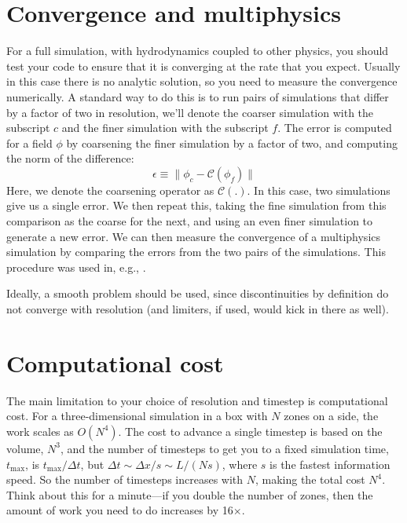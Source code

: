 \section{Convergence and multiphysics}

For a full simulation, with hydrodynamics coupled to other physics,
you should test your code to ensure that it is converging at the rate
that you expect.  Usually in this case there is no analytic solution,
so you need to measure the convergence numerically.  A standard way to
do this is to run pairs of simulations that differ by a factor of two
in resolution, we'll denote the coarser simulation with the subscript
$c$ and the finer simulation with the subscript $f$.  The error is
computed for a field $\phi$ by coarsening the finer simulation by a
factor of two, and computing the norm of the difference:
\begin{equation}
\epsilon \equiv \| \phi_c - \mathcal{C}(\phi_f) \|
\end{equation}
Here, we denote the coarsening operator as $\mathcal{C}(.)$.  In this
case, two simulations give us a single error.  We then repeat this,
taking the fine simulation from this comparison as the coarse for the
next, and using an even finer simulation to generate a new error.  We
can then measure the convergence of a multiphysics simulation by
comparing the errors from the two pairs of the simulations.  This procedure
was used in, e.g., \cite{ABNZ:III,mccorquodalecolella}.

Ideally, a smooth problem should be used, since discontinuities by
definition do not converge with resolution (and limiters, if used,
would kick in there as well).


\section{Computational cost}

The main limitation to your choice of resolution and timestep is
computational cost.  For a three-dimensional simulation in a box with
$N$ zones on a side, the work scales as $O(N^4)$.  The cost to advance
a single timestep is based on the volume, $N^3$, and the number of
timesteps to get you to a fixed simulation time, $t_\mathrm{max}$, is
$t_\mathrm{max}/\Delta t$, but $\Delta t \sim \Delta x / s \sim L/(N
s)$, where $s$ is the fastest information speed.  So the number 
of timesteps increases with $N$, making the total cost $N^4$.
Think about this for a minute---if you double the number of zones, then
the amount of work you need to do increases by 16$\times$.

